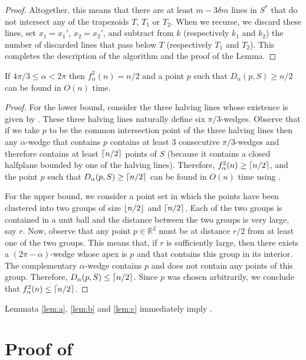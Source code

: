 \documentclass[lotsofwhite]{patmorin}
\begin{document}
\begin{proof}
Altogether, this means that there are at least $m-3\delta m$ lines in
$S^*$ that do not intersect any of the trapezoids $T$, $T_1$ or $T_2$.
When we recurse, we discard these lines, set $x_1=x_1'$, $x_2=x_2'$,
and subtract from $k$ (respectively $k_1$ and $k_2$) the number of
discarded lines that pass below $T$ (respectively $T_1$ and $T_2$).
This completes the description of the algorithm and the proof of the
Lemma.
\end{proof}

\begin{lem}
If $4\pi/3\le \alpha < 2\pi$ then $f^2_\alpha(n) = n/2$ and a point
$p$ such that $D_\alpha(p,S)\ge n/2$ can be found in $O(n)$ time.
\end{lem}

\begin{proof}
For the lower bound, consider the three halving lines whose existence
is given by .  These three halving lines
naturally define six $\pi/3$-wedges.  Observe that if we take $p$ to
be the common intersection point of the three halving lines then any
$\alpha$-wedge that contains $p$ contains at least 3 consecutive
$\pi/3$-wedges and therefore contains at least $\left\lceil n/2 \right\rceil$ points of $S$
(because it contains a closed halfplane bounded by one of the
halving lines).  Therefore, $f^2_\alpha(n)\ge \left\lceil n/2 \right\rceil$, and the
point $p$ such that $D_\alpha(p,S)\ge \left\lceil n/2 \right\rceil$ can be found in $O(n)$
time using .

 
For the upper bound, we consider a point set in which the points have
been clustered into two groups of size $\left\lfloor n/2 \right\rfloor$ and $\left\lceil n/2 \right\rceil$.
Each of the two groups is contained in a unit ball and the distance
between the two groups is very large, say $r$.  Now, observe that any
point $p\in\mathbb{R}^2$ must be at distance $r/2$ from at least one
of the two groups.  This means that, if $r$ is sufficiently large,
then there exists a $(2\pi-\alpha)$-wedge whose apex is $p$ and that
contains this group in its interior.  The complementary $\alpha$-wedge
contains $p$ and does not contain any points of this group.
Therefore, $D_\alpha(p,S)\le \left\lceil n/2 \right\rceil$.  Since $p$ was chosen
arbitrarily, we conclude that $f^2_\alpha(n)\le \left\lceil n/2 \right\rceil$.
\end{proof}

Lemmata \ref{lem:a}, \ref{lem:b} and \ref{lem:c} immediately imply
.

\section{Proof of }
\end{document}
